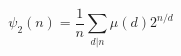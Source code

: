 \documentclass{article}
\begin{document}
    $$ \psi_2(n) = \frac{1}{n} \sum_{d|n} \mu(d)2^{n/d} $$
\end{document}

